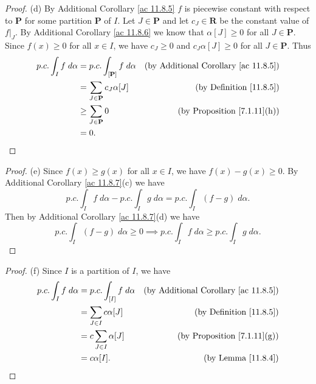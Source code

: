 \begin{proof}{(d)}
    By Additional Corollary \ref{ac 11.8.5} \(f\) is piecewise constant with respect to \(\mathbf{P}\) for some partition \(\mathbf{P}\) of \(I\).
    Let \(J \in \mathbf{P}\) and let \(c_J \in \mathbf{R}\) be the constant value of \(f|_J\).
    By Additional Corollary \ref{ac 11.8.6} we know that \(\alpha[J] \geq 0\) for all \(J \in \mathbf{P}\).
    Since \(f(x) \geq 0\) for all \(x \in I\), we have \(c_J \geq 0\) and \(c_J \alpha[J] \geq 0\) for all \(J \in \mathbf{P}\).
    Thus
    \begin{align*}
        p.c. \int_I f \; d \alpha & = p.c. \int_{[\mathbf{P}]} f \; d \alpha & \text{(by Additional Corollary \ref{ac 11.8.5})} \\
                                  & = \sum_{J \in \mathbf{P}} c_J \alpha[J]  & \text{(by Definition \ref{11.8.5})}              \\
                                  & \geq \sum_{J \in \mathbf{P}} 0           & \text{(by Proposition \ref{7.1.11}(h))}          \\
                                  & = 0.
    \end{align*}
\end{proof}

\begin{proof}{(e)}
    Since \(f(x) \geq g(x)\) for all \(x \in I\), we have \(f(x) - g(x) \geq 0\).
    By Additional Corollary \ref{ac 11.8.7}(c) we have
    \[
        p.c. \int_I f \; d \alpha - p.c. \int_I g \; d \alpha = p.c. \int_I (f - g) \; d \alpha.
    \]
    Then by Additional Corollary \ref{ac 11.8.7}(d) we have
    \[
        p.c. \int_I (f - g) \; d \alpha \geq 0 \implies p.c. \int_I f \; d \alpha \geq p.c. \int_I g \; d \alpha.
    \]
\end{proof}

\begin{proof}{(f)}
    Since \(I\) is a partition of \(I\), we have
    \begin{align*}
        p.c. \int_I f \; d \alpha & = p.c. \int_{[I]} f \; d \alpha & \text{(by Additional Corollary \ref{ac 11.8.5})} \\
                                  & = \sum_{J \in I} c \alpha[J]    & \text{(by Definition \ref{11.8.5})}              \\
                                  & = c \sum_{J \in I} \alpha[J]    & \text{(by Proposition \ref{7.1.11}(g))}          \\
                                  & = c \alpha[I].                  & \text{(by Lemma \ref{11.8.4})}
    \end{align*}
\end{proof}

